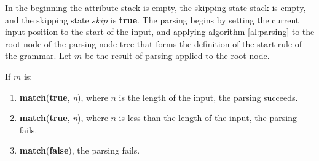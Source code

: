 \documentclass[a4paper,oneside,11pt]{book}
\theoremstyle{definition}
\begin{document}
In the beginning the attribute stack is empty, the skipping state stack is empty, and the skipping state $skip$ is \textbf{true}.
The parsing begins by setting the current input position to the start of the input, and
applying algorithm \ref{al:parsing} to the root node of the parsing node tree that forms
the definition of the start rule of the grammar.
Let $m$ be the result of parsing applied to the root node.

If $m$ is:
\begin{enumerate}
\item
\textbf{match}(\textbf{true}, \emph{n}), where $n$ is the length of the input, the parsing succeeds.
\item
\textbf{match}(\textbf{true}, \emph{n}), where $n$ is less than the length of the input, the parsing fails.
\item
\textbf{match}(\textbf{false}), the parsing fails.
\end{enumerate}
\end{document}
